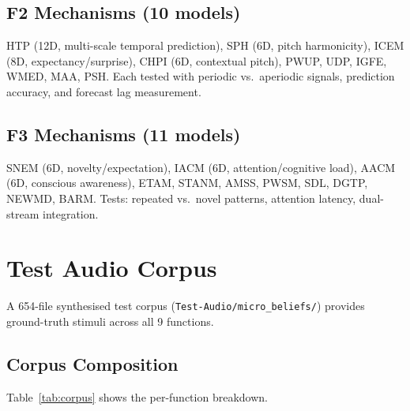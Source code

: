 \documentclass[10pt,twocolumn]{article}
\newcommand{\fn}[1]{\textbf{F#1}}
\begin{document}
\subsection{\fn{2} Mechanisms (10 models)}

HTP (12D, multi-scale temporal prediction), SPH (6D, pitch harmonicity), ICEM (8D, expectancy/surprise), CHPI (6D, contextual pitch), PWUP, UDP, IGFE, WMED, MAA, PSH. Each tested with periodic vs.\ aperiodic signals, prediction accuracy, and forecast lag measurement.

\subsection{\fn{3} Mechanisms (11 models)}

SNEM (6D, novelty/expectation), IACM (6D, attention/cognitive load), AACM (6D, conscious awareness), ETAM, STANM, AMSS, PWSM, SDL, DGTP, NEWMD, BARM. Tests: repeated vs.\ novel patterns, attention latency, dual-stream integration.

\section{Test Audio Corpus}
\label{sec:corpus}

A 654-file synthesised test corpus (\texttt{Test-Audio/micro\_beliefs/}) provides ground-truth stimuli across all 9 functions.

\subsection{Corpus Composition}

Table~\ref{tab:corpus} shows the per-function breakdown.
\end{document}
